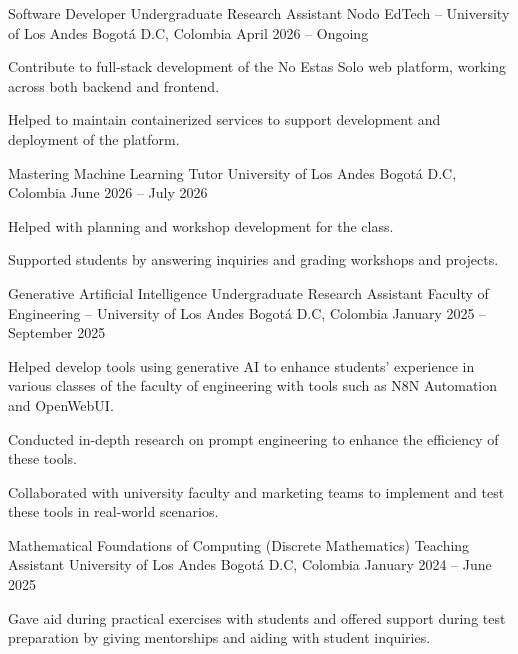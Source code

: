 \documentclass[11pt, a4paper]{awesome-cv}
\begin{document}
\begin{cventries}

\cventry
    {Software Developer Undergraduate Research Assistant}
    {Nodo EdTech -- University of Los Andes}
    {Bogot\'a D.C, Colombia}
    {April 2026 -- Ongoing}
    {
      \begin{cvitems}
        \item {Contribute to full-stack development of the No Estas Solo web platform, working across both backend and frontend.}
        \item {Helped to maintain containerized services to support development and deployment of the platform.}
      \end{cvitems}
    }

  \cventry
    {Mastering Machine Learning Tutor}
    {University of Los Andes}
    {Bogot\'a D.C, Colombia}
    {June 2026 -- July 2026}
    {
      \begin{cvitems}
        \item {Helped with planning and workshop development for the class.}
        \item {Supported students by answering inquiries and grading workshops and projects.}
      \end{cvitems}
    }

  \cventry
    {Generative Artificial Intelligence Undergraduate Research Assistant}
    {Faculty of Engineering -- University of Los Andes}
    {Bogot\'a D.C, Colombia}
    {January 2025 -- September 2025}
    {
      \begin{cvitems}
        \item {Helped develop tools using generative AI to enhance students' experience in various classes of the faculty of engineering with tools such as N8N Automation and OpenWebUI.}
        \item {Conducted in-depth research on prompt engineering to enhance the efficiency of these tools.}
        \item {Collaborated with university faculty and marketing teams to implement and test these tools in real-world scenarios.}
      \end{cvitems}
    }

  \cventry
    {Mathematical Foundations of Computing (Discrete Mathematics) Teaching Assistant}
    {University of Los Andes}
    {Bogot\'a D.C, Colombia}
    {January 2024 -- June 2025}
    {
      \begin{cvitems}
        \item {Gave aid during practical exercises with students and offered support during test preparation by giving mentorships and aiding with student inquiries.}
      \end{cvitems}
    }


\end{cventries}
\end{document}
